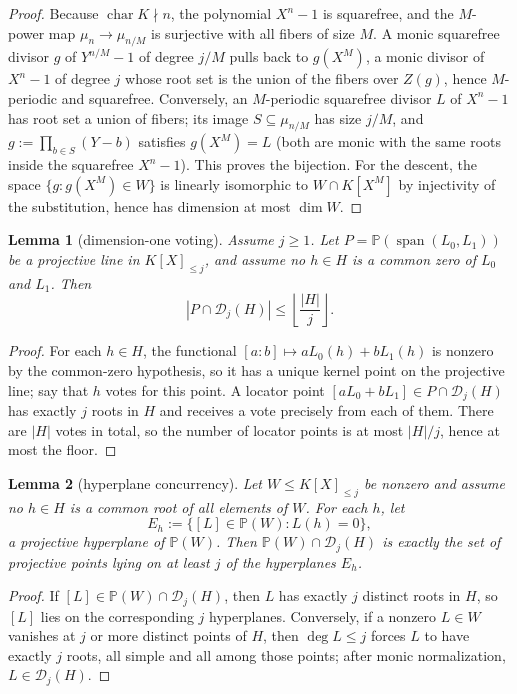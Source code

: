 \documentclass[11pt]{article}
\newtheorem{lemma}[lemma]{Lemma}
\theoremstyle{definition}
\theoremstyle{remark}
\providecommand{\Dloc}{\mathcal D}
\providecommand{\PP}{\mathbb P}
\providecommand{\Span}{\operatorname{span}}
\providecommand{\floor}[1]{\left\lfloor #1\right\rfloor}
\begin{document}
\begin{proof}
Because $\operatorname{char}K\nmid n$, the polynomial $X^n-1$ is squarefree, and the $M$-power map $\mu_n\to\mu_{n/M}$ is surjective with all fibers of size $M$.  A monic squarefree divisor $g$ of $Y^{n/M}-1$ of degree $j/M$ pulls back to $g(X^M)$, a monic divisor of $X^n-1$ of degree $j$ whose root set is the union of the fibers over $Z(g)$, hence $M$-periodic and squarefree.  Conversely, an $M$-periodic squarefree divisor $L$ of $X^n-1$ has root set a union of fibers; its image $S\subseteq\mu_{n/M}$ has size $j/M$, and $g:=\prod_{b\in S}(Y-b)$ satisfies $g(X^M)=L$ \textup{(both are monic with the same roots inside the squarefree $X^n-1$)}.  This proves the bijection.  For the descent, the space $\{g:g(X^M)\in W\}$ is linearly isomorphic to $W\cap K[X^M]$ by injectivity of the substitution, hence has dimension at most $\dim W$.
\end{proof}

\begin{lemma}[dimension-one voting]\label{lem:capf-dim1}
Assume $j\ge1$.  Let $P=\PP(\Span(L_0,L_1))$ be a projective line in $K[X]_{\le j}$, and assume no $h\in H$ is a common zero of $L_0$ and $L_1$.  Then
\[
        |P\cap\Dloc_j(H)|\le\floor{\frac{|H|}{j}}.
\]
\end{lemma}

\begin{proof}
For each $h\in H$, the functional $[a:b]\mapsto aL_0(h)+bL_1(h)$ is nonzero by the common-zero hypothesis, so it has a unique kernel point on the projective line; say that $h$ votes for this point.  A locator point $[aL_0+bL_1]\in P\cap\Dloc_j(H)$ has exactly $j$ roots in $H$ and receives a vote precisely from each of them.  There are $|H|$ votes in total, so the number of locator points is at most $|H|/j$, hence at most the floor.
\end{proof}

\begin{lemma}[hyperplane concurrency]\label{lem:capf-concurrency}
Let $W\le K[X]_{\le j}$ be nonzero and assume no $h\in H$ is a common root of all elements of $W$.  For each $h$, let
\[
        E_h:=\{[L]\in\PP(W):L(h)=0\},
\]
a projective hyperplane of $\PP(W)$.  Then $\PP(W)\cap\Dloc_j(H)$ is exactly the set of projective points lying on at least $j$ of the hyperplanes $E_h$.
\end{lemma}

\begin{proof}
If $[L]\in\PP(W)\cap\Dloc_j(H)$, then $L$ has exactly $j$ distinct roots in $H$, so $[L]$ lies on the corresponding $j$ hyperplanes.  Conversely, if a nonzero $L\in W$ vanishes at $j$ or more distinct points of $H$, then $\deg L\le j$ forces $L$ to have exactly $j$ roots, all simple and all among those points; after monic normalization, $L\in\Dloc_j(H)$.
\end{proof}
\end{document}
